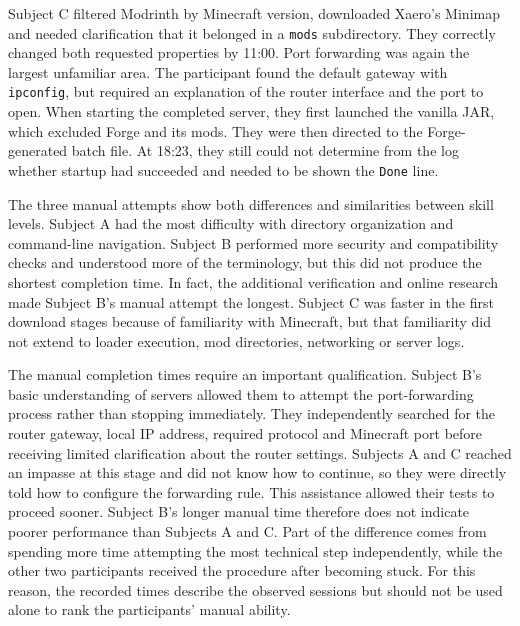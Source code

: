 Subject C filtered Modrinth by Minecraft version, downloaded Xaero's Minimap and needed clarification that it belonged in a \texttt{mods} subdirectory. They correctly changed both requested properties by 11:00. Port forwarding was again the largest unfamiliar area. The participant found the default gateway with \texttt{ipconfig}, but required an explanation of the router interface and the port to open. When starting the completed server, they first launched the vanilla JAR, which excluded Forge and its mods. They were then directed to the Forge-generated batch file. At 18:23, they still could not determine from the log whether startup had succeeded and needed to be shown the \texttt{Done} line.

The three manual attempts show both differences and similarities between skill levels. Subject A had the most difficulty with directory organization and command-line navigation. Subject B performed more security and compatibility checks and understood more of the terminology, but this did not produce the shortest completion time. In fact, the additional verification and online research made Subject B's manual attempt the longest. Subject C was faster in the first download stages because of familiarity with Minecraft, but that familiarity did not extend to loader execution, mod directories, networking or server logs.

The manual completion times require an important qualification. Subject B's basic understanding of servers allowed them to attempt the port-forwarding process rather than stopping immediately. They independently searched for the router gateway, local IP address, required protocol and Minecraft port before receiving limited clarification about the router settings. Subjects A and C reached an impasse at this stage and did not know how to continue, so they were directly told how to configure the forwarding rule. This assistance allowed their tests to proceed sooner. Subject B's longer manual time therefore does not indicate poorer performance than Subjects A and C. Part of the difference comes from spending more time attempting the most technical step independently, while the other two participants received the procedure after becoming stuck. For this reason, the recorded times describe the observed sessions but should not be used alone to rank the participants' manual ability.

